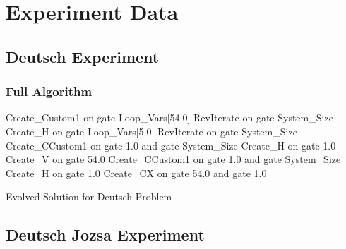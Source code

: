 \chapter{Experiment Data}

\section{Deutsch Experiment}
\label{sec:DeutschExpApp}
\subsection{Full Algorithm}
\label{sec:DeutschExpAppFullAlg}

\begin{algorithm}
 \begin{algorithmic}
\STATE Create\_Custom1 on gate Loop\_Vars[54.0]
\STATE RevIterate on gate System\_Size
\STATE Create\_H on gate Loop\_Vars[5.0]
\STATE RevIterate on gate System\_Size
\STATE Create\_CCustom1 on gate 1.0 and gate System\_Size
\STATE Create\_H on gate 1.0
\STATE Create\_V on gate 54.0
\STATE Create\_CCustom1 on gate 1.0 and gate System\_Size
\STATE Create\_H on gate 1.0
\STATE Create\_CX on gate 54.0 and gate 1.0
 \end{algorithmic}
\caption{Evolved Solution for Deutsch Problem}
\label{alg:evodeutsch}
\end{algorithm}








\clearpage
\section{Deutsch Jozsa Experiment}
\label{sec:deutschjozsa}

